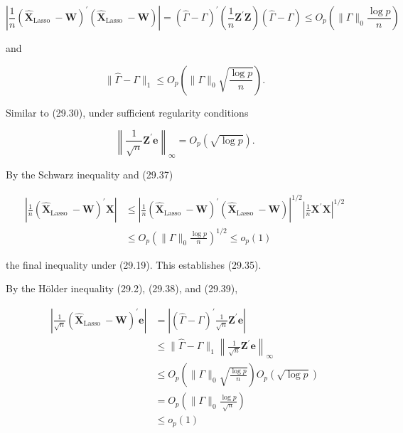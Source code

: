 \documentclass[10pt]{article}
\begin{document}
$$
\left|\frac{1}{n}\left(\widehat{\boldsymbol{X}}_{\text {Lasso }}-\boldsymbol{W}\right)^{\prime}\left(\widehat{\boldsymbol{X}}_{\text {Lasso }}-\boldsymbol{W}\right)\right|=(\widehat{\Gamma}-\Gamma)^{\prime}\left(\frac{1}{n} \boldsymbol{Z}^{\prime} \boldsymbol{Z}\right)(\widehat{\Gamma}-\Gamma) \leq O_{p}\left(\|\Gamma\|_{0} \frac{\log p}{n}\right)
$$

and

$$
\|\widehat{\Gamma}-\Gamma\|_{1} \leq O_{p}\left(\|\Gamma\|_{0} \sqrt{\frac{\log p}{n}}\right) .
$$

Similar to (29.30), under sufficient regularity conditions

$$
\left\|\frac{1}{\sqrt{n}} \boldsymbol{Z}^{\prime} \boldsymbol{e}\right\|_{\infty}=O_{p}(\sqrt{\log p}) .
$$

By the Schwarz inequality and (29.37)

$$
\begin{aligned}
\left|\frac{1}{n}\left(\widehat{\boldsymbol{X}}_{\text {Lasso }}-\boldsymbol{W}\right)^{\prime} \boldsymbol{X}\right| & \leq\left|\frac{1}{n}\left(\widehat{\boldsymbol{X}}_{\text {Lasso }}-\boldsymbol{W}\right)^{\prime}\left(\widehat{\boldsymbol{X}}_{\text {Lasso }}-\boldsymbol{W}\right)\right|^{1 / 2}\left|\frac{1}{n} \boldsymbol{X}^{\prime} \boldsymbol{X}\right|^{1 / 2} \\
& \leq O_{p}\left(\|\Gamma\|_{0} \frac{\log p}{n}\right)^{1 / 2} \leq o_{p}(1)
\end{aligned}
$$

the final inequality under (29.19). This establishes (29.35).

By the Hölder inequality (29.2), (29.38), and (29.39),

$$
\begin{aligned}
\left|\frac{1}{\sqrt{n}}\left(\widehat{\boldsymbol{X}}_{\text {Lasso }}-\boldsymbol{W}\right)^{\prime} \boldsymbol{e}\right| &=\left|(\widehat{\Gamma}-\Gamma)^{\prime} \frac{1}{\sqrt{n}} \boldsymbol{Z}^{\prime} \boldsymbol{e}\right| \\
& \leq\|\widehat{\Gamma}-\Gamma\|_{1}\left\|\frac{1}{\sqrt{n}} \boldsymbol{Z}^{\prime} \boldsymbol{e}\right\|_{\infty} \\
& \leq O_{p}\left(\|\Gamma\|_{0} \sqrt{\frac{\log p}{n}}\right) O_{p}(\sqrt{\log p}) \\
&=O_{p}\left(\|\Gamma\|_{0} \frac{\log p}{\sqrt{n}}\right) \\
& \leq o_{p}(1)
\end{aligned}
$$
\end{document}
